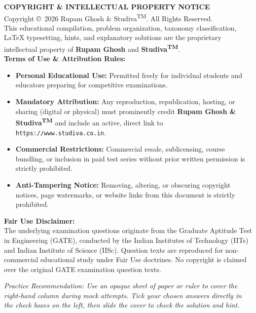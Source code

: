 \documentclass[a4paper,10pt]{article}
\begin{document}
\vspace{1.5em}
\begin{tcolorbox}[enhanced, standard jigsaw, opacityback=0, colframe=black!40, arc=1mm, boxrule=0.5pt, left=10pt, right=10pt, top=8pt, bottom=8pt]
\textbf{\large COPYRIGHT \& INTELLECTUAL PROPERTY NOTICE}\\[0.6em]
Copyright \copyright\ 2026 Rupam Ghosh \& Studiva\textsuperscript{TM}. All Rights Reserved.\\[0.5em]
This educational compilation, problem organization, taxonomy classification, LaTeX typesetting, hints, and explanatory solutions are the proprietary intellectual property of \textbf{Rupam Ghosh} and \textbf{Studiva\textsuperscript{TM}}.\\[0.6em]
\textbf{Terms of Use \& Attribution Rules:}
\begin{itemize}[leftmargin=*, nosep]
    \item \textbf{Personal Educational Use:} Permitted freely for individual students and educators preparing for competitive examinations.
    \item \textbf{Mandatory Attribution:} Any reproduction, republication, hosting, or sharing (digital or physical) must prominently credit \textbf{Rupam Ghosh \& Studiva\textsuperscript{TM}} and include an active, direct link to \texttt{https://www.studiva.co.in}.
    \item \textbf{Commercial Restrictions:} Commercial resale, sublicensing, course bundling, or inclusion in paid test series without prior written permission is strictly prohibited.
    \item \textbf{Anti-Tampering Notice:} Removing, altering, or obscuring copyright notices, page watermarks, or website links from this document is strictly prohibited.
\end{itemize}
\vspace{0.6em}
\textbf{Fair Use Disclaimer:}\\
The underlying examination questions originate from the Graduate Aptitude Test in Engineering (GATE), conducted by the Indian Institutes of Technology (IITs) and Indian Institute of Science (IISc). Question texts are reproduced for non-commercial educational study under Fair Use doctrines. No copyright is claimed over the original GATE examination question texts.
\end{tcolorbox}

\vspace{1.2em}
\begin{center}
\small\itshape
Practice Recommendation: Use an opaque sheet of paper or ruler to cover the right-hand column during mock attempts. Tick your chosen answers directly in the check boxes on the left, then slide the cover to check the solution and hint.
\end{center}
\end{document}
